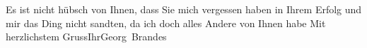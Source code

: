 \begin{ledgroupsized}[t]{13cm}
           \pstart
           Es ist nicht hübsch von Ihnen, dass Sie mich vergessen haben in Ihrem Erfolg und
                        mir das Ding
                    nicht sandten, da ich doch alles Andere von Ihnen habe\pend
           \pstart Mit herzlichstem Gruss\hspace*{3.5em}Ihr\hspace*{3.5em}\spacefill\mbox{Georg Brandes}\pend{}\endnumbering{}\end{ledgroupsized}  \newcommand{\dateiname}{L00541}\newcommand{\titel}{Georg Brandes an Arthur Schnitzler, 22. 4. 1896}\newcommand{\editorInnen}{Martin Anton Müller und Gerd-Hermann Susen}
      
